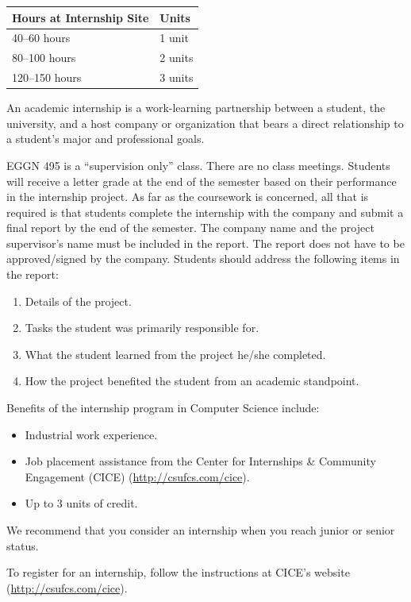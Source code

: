 \documentclass{book}
\newcommand{\shrunkurl}[1]{\url{http://csufcs.com/#1}}
\begin{document}
\begin{center}
\begin{tabular}{|l|l|} \hline
  \textbf{Hours at Internship Site} & \textbf{Units} \\ \hline
  40--60 hours & 1 unit \\ \hline
  80--100 hours & 2 units \\ \hline
  120--150 hours & 3 units \\ \hline
\end{tabular}
\end{center}

An academic internship is a work-learning partnership between a student, the university, and a host company or organization that bears a direct relationship to a student’s major and professional goals.

EGGN 495 is a ``supervision only'' class. There are no class meetings. Students will receive a letter grade at the end of the semester based on their performance in the internship project. As far as the coursework is concerned, all that is required is that students complete the internship with the company and submit a final report by the end of the semester. The company name and the project supervisor's name must be included in the report. The report does not have to be approved/signed by the company. Students should address the following items in the report:
\begin{enumerate}
\item Details of the project.
\item Tasks the student was primarily responsible for.
\item What the student learned from the project he/she completed.
\item How the project benefited the student from an academic standpoint.
\end{enumerate}

Benefits of the internship program in Computer Science include:
\begin{itemize}
\item Industrial work experience.
\item Job placement assistance from the Center for Internships \& Community Engagement (CICE) (\shrunkurl{cice}).
\item Up to 3 units of credit.
\end{itemize}

We recommend that you consider an internship when you reach junior or senior status.

To register for an internship, follow the instructions at CICE's website (\shrunkurl{cice}).
\end{document}
